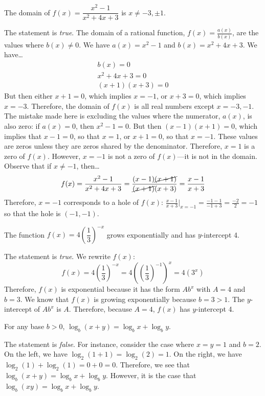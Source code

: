 \documentclass[11pt,letterpaper]{article}
\begin{document}
 The domain of $f(x)= \dfrac{x^2 - 1}{x^2 + 4x + 3}$ is $x \neq -3, \pm 1$. \pspace

\sol The statement is \textit{true}. The domain of a rational function, $f(x)= \frac{a(x)}{b(x)}$, are the values where $b(x) \neq 0$. We have $a(x)= x^2 - 1$ and $b(x)= x^2 + 4x + 3$. We have\dots
	\[
	\begin{gathered}
	b(x)= 0 \\
	x^2 + 4x + 3= 0 \\
	(x + 1)(x + 3)= 0 
	\end{gathered}
	\]
But then either $x + 1= 0$, which implies $x= -1$, or $x + 3=0 $, which implies $x= -3$. Therefore, the domain of $f(x)$ is all real numbers except $x= -3, -1$. The mistake made here is excluding the values where the numerator, $a(x)$, is also zero: if $a(x)= 0$, then $x^2 - 1= 0$. But then $(x - 1)(x + 1)= 0$, which implies that $x - 1= 0$, so that $x= 1$, or $x + 1= 0$, so that $x= -1$. These values are zeros unless they are zeros shared by the denominator. Therefore, $x= 1$ is a zero of $f(x)$. However, $x= -1$ is not a zero of $f(x)$---it is not in the domain. Observe that if $x \neq -1$, then\dots
	\[
	f(x)= \dfrac{x^2 - 1}{x^2 + 4x + 3}= \dfrac{(x - 1) \cancel{(x + 1)}}{\cancel{(x + 1)} (x + 3)}= \dfrac{x - 1}{x + 3}
	\]
Therefore, $x= -1$ corresponds to a hole of $f(x)$: $\frac{x - 1}{x + 3} \big|_{x= -1}= \frac{-1 - 1}{-1 + 3}= \frac{-2}{2}= -1$ so that the hole is $(-1, -1)$. 



\newpage



 The function $f(x)= 4 \left( \dfrac{1}{3} \right)^{-x}$ grows exponentially and has $y$-intercept 4. \pspace

\sol The statement is \textit{true}. We rewrite $f(x)$:
	\[
	f(x)= 4 \left( \dfrac{1}{3} \right)^{-x}= 4 \left( \left( \dfrac{1}{3} \right)^{-1} \right)^x= 4(3^x)
	\]
Therefore, $f(x)$ is exponential because it has the form $Ab^x$ with $A= 4$ and $b= 3$. We know that $f(x)$ is growing exponentially because $b= 3 > 1$. The $y$-intercept of $Ab^x$ is $A$. Therefore, because $A= 4$, $f(x)$ has $y$-intercept 4. \pvspace{1.3cm}



 For any base $b > 0$, $\log_b(x + y)= \log_b x + \log_b y$. \pspace

\sol The statement is \textit{false}. For instance, consider the case where $x= y= 1$ and $b= 2$. On the left, we have $\log_2(1 + 1)= \log_2(2)= 1$. On the right, we have $\log_2(1) + \log_2(1)= 0 + 0= 0$. Therefore, we see that $\log_b(x + y)= \log_b x + \log_b y$. However, it is the case that $\log_b(xy)= \log_b x + \log_b y$. \pvspace{1.3cm}
\end{document}
